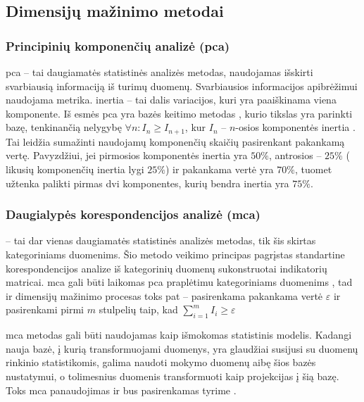 \subsection{Dimensijų mažinimo metodai}

\subsubsection{Principinių komponenčių analizė (\gls{pca})}

\gls{pca} -- tai daugiamatės statistinės analizės metodas, naudojamas išskirti svarbiausią informaciją iš turimų duomenų. Svarbiausios informacijos apibrėžimui naudojama  metrika. \Gls{inertia} -- tai dalis variacijos, kuri yra paaiškinama viena komponente. Iš esmės \gls{pca} yra bazės keitimo metodas , kurio tikslas yra parinkti bazę, tenkinančią nelygybę $\forall n: I_n \ge I_{n+1}$, kur $I_n$ -- $n$-osios komponentės \gls{inertia} \cite{abdiPrincipalComponentAnalysis2010}. Tai leidžia sumažinti naudojamų komponenčių skaičių pasirenkant pakankamą  vertę. Pavyzdžiui, jei pirmosios komponentės \gls{inertia} yra $50\%$, antrosios -- $25\%$ (\rightarrow \; likusių komponenčių \gls{inertia} lygi $25\%$) ir pakankama  vertė yra $70\%$, tuomet užtenka palikti pirmas dvi komponentes, kurių bendra \gls{inertia}  yra $75\%$.

\subsubsection{Daugialypės korespondencijos analizė (\gls{mca})}\label{sec:literature:mca}

 -- tai dar vienas daugiamatės statistinės analizės metodas, tik šis skirtas kategoriniams duomenims. Šio metodo veikimo principas pagrįstas standartine korespondencijos analize  iš kategorinių duomenų sukonstruotai indikatorių matricai. \gls{mca} gali būti laikomas \gls{pca} praplėtimu kategoriniams duomenims \cite{abdiMultipleCorrespondenceAnalysis2007}, tad ir dimensijų mažinimo procesas toks pat -- pasirenkama pakankama  vertė $\varepsilon$ ir pasirenkami pirmi $m$ stulpelių taip, kad $\sum_{i=1}^m{I_i} \ge \varepsilon$

\gls{mca} metodas gali būti naudojamas kaip išmokomas statistinis modelis. Kadangi nauja bazė, į kurią transformuojami duomenys, yra glaudžiai susijusi su duomenų rinkinio statistikomis, galima naudoti mokymo duomenų aibę šios bazės nustatymui, o tolimesnius duomenis transformuoti kaip projekcijas į šią bazę. Toks \gls{mca} panaudojimas ir bus pasirenkamas tyrime .